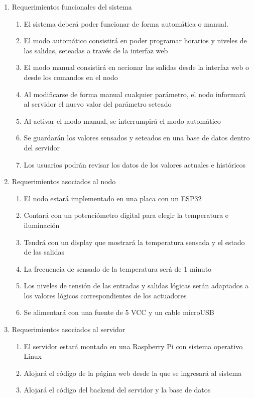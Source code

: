 \documentclass[
11pt, %
]{charter}
\begin{document}
\begin{enumerate}
	\item Requerimientos funcionales del sistema
		\begin{enumerate}
			\item El sistema deberá poder funcionar de forma automática o manual.	
			\item El modo automático consistirá en poder programar horarios y niveles de las salidas, seteadas a través de la interfaz web
			\item El modo manual consistirá en accionar las salidas desde la interfaz web o desde los comandos en el nodo
			\item Al modificarse de forma manual cualquier parámetro, el nodo informará al servidor el nuevo valor del parámetro seteado
			\item Al activar el modo manual, se interrumpirá el modo automático
			\item Se guardarán los valores sensados y seteados en una base de datos dentro del servidor
			\item Los usuarios podrán revisar los datos de los valores actuales e históricos
		\end{enumerate}
	\item Requerimientos asociados al nodo
		\begin{enumerate}
			\item El nodo estará implementado en una placa con un ESP32
			\item Contará con un potenciómetro digital para elegir la temperatura e iluminación
			\item Tendrá con un display que mostrará la temperatura sensada y el estado de las salidas
			\item La frecuencia de sensado de la temperatura será de 1 minuto
			\item Los niveles de tensión de las entradas y salidas lógicas serán adaptados a los valores lógicos correspondientes de los actuadores
			\item Se alimentará con una fuente de 5 VCC y un cable microUSB
		\end{enumerate}
	\item Requerimientos asociados al servidor
		\begin{enumerate}
			\item El servidor estará montado en una Raspberry Pi con sistema operativo Linux
			\item Alojará el código de la página web desde la que se ingresará al sistema
			\item Alojará el código del backend del servidor y la base de datos

\end{enumerate}
\end{enumerate}
\end{document}
